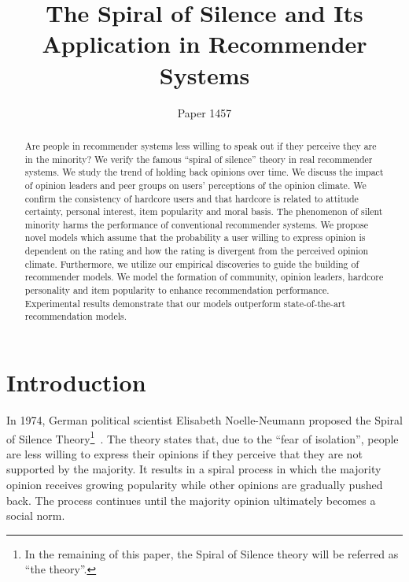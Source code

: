 \documentclass[sigconf]{acmart}
\begin{document}
\title{The Spiral of Silence and Its Application in Recommender Systems}
\author{Paper 1457}


\begin{abstract}
Are people in recommender systems less willing to speak out if they perceive they are in the minority? We verify the famous ``spiral of silence'' theory in real recommender systems. We study the trend of holding back opinions over time. We discuss the impact of opinion leaders and peer groups on users' perceptions of the opinion climate. We confirm the consistency of hardcore users and that hardcore is related to attitude certainty, personal interest, item popularity and moral basis. The phenomenon of silent minority harms the performance of conventional recommender systems. We propose novel models which assume that the probability a user willing to express opinion is dependent on the rating and how the rating is divergent from the perceived opinion climate. Furthermore, we utilize our empirical discoveries to guide the building of recommender models. We model the formation of community, opinion leaders, hardcore personality and item popularity to enhance recommendation performance.  Experimental results demonstrate that our models  outperform state-of-the-art recommendation models.
  

\end{abstract}



\maketitle
\section{Introduction}\label{sec:introduction}

In 1974, German political scientist Elisabeth Noelle-Neumann proposed the Spiral of Silence Theory\footnote{In the remaining of this paper, the Spiral of Silence theory will be referred as ``the theory''.}~\cite{Neolle-Neumann1993spiral}. The theory states that, due to the ``fear of isolation'', people are less willing to express their opinions if they perceive that they are not supported by the majority. It results in a spiral process in which the majority opinion receives growing popularity while other opinions are gradually pushed back. The process continues until the majority opinion ultimately becomes a social norm.
\end{document}
